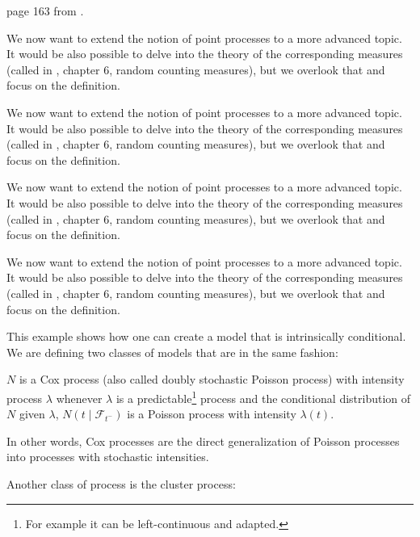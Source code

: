 \begin{ajoutationV}{}{}
page 163 from \cite{daley}.


We now want to extend the notion of point processes to a more advanced topic. It would be also possible to delve into the theory of the corresponding measures (called in \cite{daley}, chapter 6, random counting measures), but we overlook that and focus on the definition.


We now want to extend the notion of point processes to a more advanced topic. It would be also possible to delve into the theory of the corresponding measures (called in \cite{daley}, chapter 6, random counting measures), but we overlook that and focus on the definition.

We now want to extend the notion of point processes to a more advanced topic. It would be also possible to delve into the theory of the corresponding measures (called in \cite{daley}, chapter 6, random counting measures), but we overlook that and focus on the definition.


We now want to extend the notion of point processes to a more advanced topic. It would be also possible to delve into the theory of the corresponding measures (called in \cite{daley}, chapter 6, random counting measures), but we overlook that and focus on the definition.
\end{ajoutationV}


This example shows how one can create a model that is intrinsically conditional. We are defining two classes of models that are in the same fashion:


\begin{definition}
$N$ is a Cox process (also called doubly stochastic Poisson process) with intensity process $\lambda$ whenever $\lambda$ is a predictable\footnote{For example it can be left-continuous and adapted.} process and the conditional distribution of $N$ given $\lambda$, $N(t \mid \mathcal F_{t^-})$ is a Poisson process with intensity $\lambda (t) $. 

In other words, Cox processes are the direct generalization of Poisson processes into processes with stochastic intensities.

\end{definition}

Another class of process is the cluster process:

